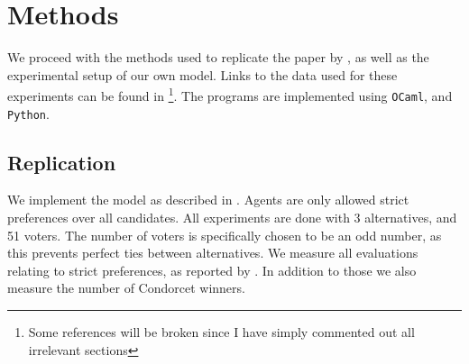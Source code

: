 \chapter{Methods}
\label{Methods}

We proceed with the methods used to replicate the paper by \citet{radDeliberationSinglePeakednessCoherent2021}, as well as the experimental setup of our own model. Links to the data used for these experiments can be found in \footnote{Some references will be broken since I have simply commented out all irrelevant sections}. The programs are implemented using \texttt{OCaml}, and \texttt{Python}.


\section{Replication}
We implement the model as described in . Agents are only allowed strict preferences over all candidates. All experiments are done with 3 alternatives, and 51 voters. The number of voters is specifically chosen to be an odd number, as this prevents perfect ties between alternatives. We measure all evaluations relating to strict preferences, as reported by \citet{radDeliberationSinglePeakednessCoherent2021}. In addition to those we also measure the number of Condorcet winners.

